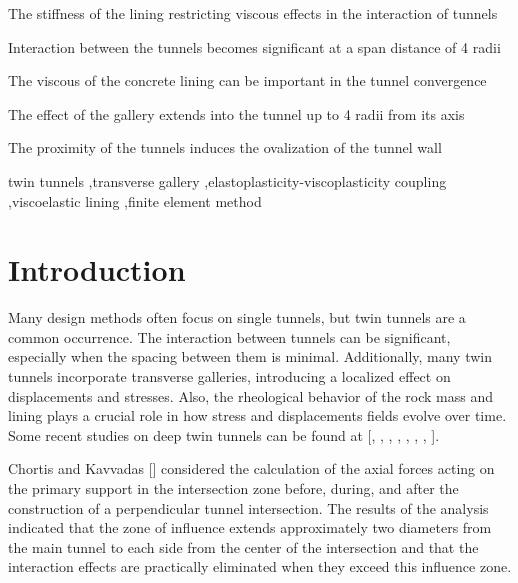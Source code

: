\documentclass[a4paper,fleqn]{cas-sc}
\begin{document}
\begin{highlights}
	\item The stiffness of the lining restricting viscous effects in the interaction of tunnels
	\item Interaction between the tunnels becomes significant at a span distance of 4 radii
	\item The viscous of the concrete lining can be important in the tunnel convergence
	\item The effect of the gallery extends into the tunnel up to 4 radii from its axis
	\item The proximity of the tunnels induces the ovalization of the tunnel wall 
\end{highlights}

\begin{keywords}
twin tunnels \sep transverse gallery \sep elastoplasticity-viscoplasticity coupling
\sep viscoelastic lining \sep finite element method
\end{keywords}

\maketitle

\section{Introduction}\label{}

Many design methods often focus on single tunnels, but twin tunnels are a common occurrence. The interaction between tunnels can be significant, especially when the spacing between them is minimal. Additionally, many twin tunnels incorporate transverse galleries, introducing a localized effect on displacements and stresses. Also, the rheological behavior of the rock mass and lining plays a crucial role in how stress and displacements fields evolve over time. Some recent studies on deep twin tunnels can be found at [, , , , , , , ].

Chortis and Kavvadas [] considered the calculation of the axial forces acting on the primary support in the intersection zone before, during, and after the construction of a perpendicular tunnel intersection. The results of the analysis indicated that the zone of influence extends approximately two diameters from the main tunnel to each side from the center of the intersection and that the interaction effects are practically eliminated when they exceed this influence zone. 
\end{document}
